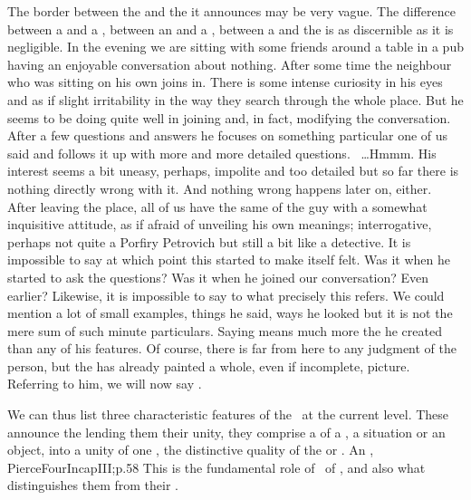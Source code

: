 The border between the  and the  it announces may be
very vague. The difference between a  and a , between an  and a 
, between a  and the
 is as discernible as it is negligible. 
%
In the evening we are sitting with some friends around a table in a pub having
an enjoyable conversation about nothing. After some time the neighbour who was
sitting on his own joins in. There is some intense curiosity in his eyes and as
if slight irritability in the way they search through the whole place. But he
seems to be doing quite well in joining and, in fact, modifying the
conversation. After a few questions and answers he focuses on something
particular one of us said and follows it up with more and more detailed
questions. ~\ldots Hmmm.  His interest seems
a bit uneasy, perhaps, impolite and too detailed but so far there is nothing
directly wrong with it. And nothing wrong happens later on, either. After
leaving the place, all of us have the same  of the guy with a
somewhat inquisitive attitude, as if afraid of unveiling his own meanings;
interrogative, perhaps not quite a Porfiry Petrovich but still a bit like a
detective.  It is impossible to say at which point 
this  started to make itself felt. Was it when he started to ask
the questions? Was it when he joined our conversation? Even earlier?  Likewise,
it is impossible to say to what precisely this  refers. We could
mention a lot of small examples, things he said, ways he looked but it is not
the mere sum of such minute particulars. Saying  means much
more the  he created than any of his 
features.  Of course, there is far from here to any judgment of the person, but
the  has already painted a whole, even if incomplete, picture.
Referring to him, we will now say .

\pa%
We can thus list three characteristic features of the \oss\ at the current
level.  These  announce the  lending them their unity,
they comprise a  of a , a situation or an object, into
a unity of one , the distinctive quality of the  or
.  An , \citet{an emotion is always a simple
  predicate substituted by an operation of the mind for a highly complicated
  predicate.}{PierceFourIncap}{III;p.58\label{ftnt:simpleComplex}} This is the fundamental role of \oss\ 
of , and also what distinguishes them from their \rss.


